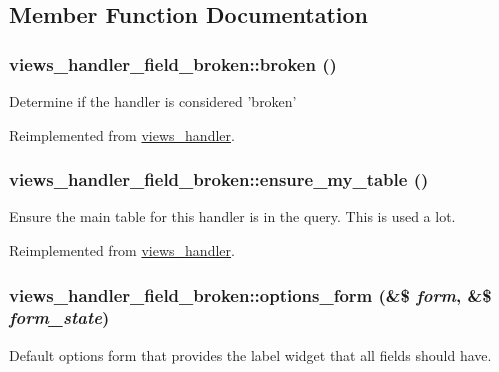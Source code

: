 \subsection{Member Function Documentation}
\hypertarget{classviews__handler__field__broken_af579634a7ec51fa709d7c0cddc135725}{
\subsubsection[{broken}]{\setlength{\rightskip}{0pt plus 5cm}views\_\-handler\_\-field\_\-broken::broken ()}}
\label{classviews__handler__field__broken_af579634a7ec51fa709d7c0cddc135725}
Determine if the handler is considered 'broken' 

Reimplemented from \hyperlink{classviews__handler_ac1cd2ff30cb558c79cc908be516fb725}{views\_\-handler}.\hypertarget{classviews__handler__field__broken_a887902026800149644e827fbb92dba15}{
\subsubsection[{ensure\_\-my\_\-table}]{\setlength{\rightskip}{0pt plus 5cm}views\_\-handler\_\-field\_\-broken::ensure\_\-my\_\-table ()}}
\label{classviews__handler__field__broken_a887902026800149644e827fbb92dba15}
Ensure the main table for this handler is in the query. This is used a lot. 

Reimplemented from \hyperlink{classviews__handler_a947f21ef0f21a77f4d103af4702b3600}{views\_\-handler}.\hypertarget{classviews__handler__field__broken_afc66860f4fb5a1878a131c30500e6e1d}{
\subsubsection[{options\_\-form}]{\setlength{\rightskip}{0pt plus 5cm}views\_\-handler\_\-field\_\-broken::options\_\-form (\&\$ {\em form}, \/  \&\$ {\em form\_\-state})}}
\label{classviews__handler__field__broken_afc66860f4fb5a1878a131c30500e6e1d}
Default options form that provides the label widget that all fields should have. 

